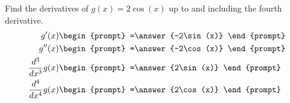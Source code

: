 \documentclass{ximera}
\author{Gregory Hartman \and Matthew Carr}
\begin{document}
\begin{exercise}




Find the derivatives of $g(x)=2\cos(x)$ up to and including the fourth derivative.
\begin{align*} 
g'(x)&
\begin{prompt}
=\answer{-2\sin(x)}
\end{prompt}\\
g''(x)&
\begin{prompt} 
=\answer{-2\cos(x)}
\end{prompt}\\
\frac{d^3}{dx^3}g(x)&
\begin{prompt} 
=\answer{2\sin(x)}
\end{prompt}\\
\frac{d^4}{dx^4}g(x) &
\begin{prompt} 
=\answer{2\cos(x)}
\end{prompt}
\end{align*}

\end{exercise}
\end{document}
